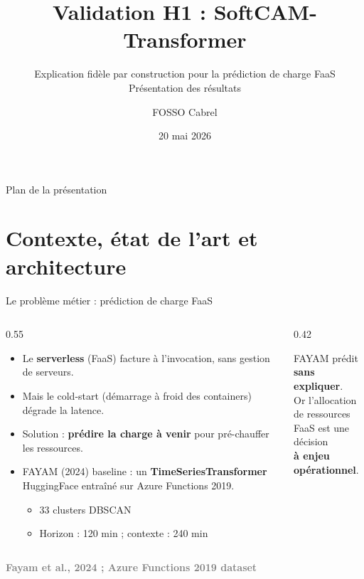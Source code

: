 \documentclass[10pt]{beamer}
\title{Validation H1 : SoftCAM-Transformer}
\subtitle{Explication fidèle par construction pour la prédiction de charge FaaS\\Présentation des résultats}
\author{FOSSO Cabrel}
\institute{Université de Dschang}
\date{20 mai 2026}
\newcommand{\source}[1]{\vspace{4pt}\hfill{\textcolor{gray}{\textbf{\tiny #1}}}}
\begin{document}

\frame{\titlepage}

\begin{frame}{Plan de la présentation}
  \tableofcontents[hideallsubsections]
\end{frame}


\section{Contexte, état de l'art et architecture}

\begin{frame}{Le problème métier : prédiction de charge FaaS}
  \begin{columns}
    \begin{column}{0.55\textwidth}
      \begin{itemize}
        \item Le \textbf{serverless} (FaaS) facture à l'invocation, sans gestion de serveurs.
        \item Mais le \alert{cold-start} (démarrage à froid des containers) dégrade la latence.
        \item Solution : \textbf{prédire la charge à venir} pour pré-chauffer les ressources.
        \item FAYAM (2024) baseline : un \textbf{TimeSeriesTransformer} HuggingFace entraîné sur Azure Functions 2019.
          \begin{itemize}
            \item 33 clusters DBSCAN
            \item Horizon : 120 min ; contexte : 240 min
          \end{itemize}
      \end{itemize}
    \end{column}
    \begin{column}{0.42\textwidth}
      \begin{constatbox}
        FAYAM prédit\\[2pt]
        \textbf{sans expliquer}.\\[6pt]
        Or l'allocation de ressources\\
        FaaS est une décision\\[2pt]
        \textbf{à enjeu opérationnel}.
      \end{constatbox}
    \end{column}
  \end{columns}
  \source{Fayam et al., 2024 ; Azure Functions 2019 dataset}
\end{frame}
\end{document}

